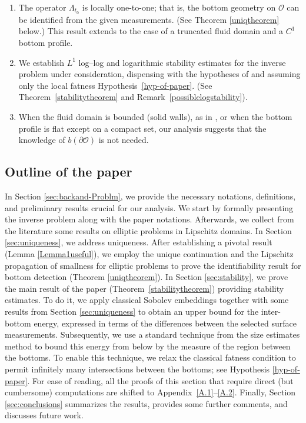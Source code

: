 \documentclass[11pt]{article}
\begin{document}
\begin{enumerate}
	\item  The operator $\Lambda_{t_0}$ is locally one-to-one; that is, the bottom geometry on $\mathcal O$ can be identified from the given measurements.  (See Theorem \ref{uniqtheorem} below.) This result extends \cite{fontelos2017bottom} to the case of a truncated fluid domain and a $C^1$ bottom profile. 
	
	\item We establish $L^{1}$ log--log and logarithmic stability estimates for the inverse problem under consideration,  dispensing with the hypotheses of \cite{lecaros2020stability} and assuming only the local fatness Hypothesis~\ref{hyp-of-paper}.  (See Theorem~\ref{stabilitytheorem} and Remark~\ref{possiblelogstability}).



	\item When the fluid domain is bounded (solid walls), as in \cite{lecaros2020stability}, or when the bottom profile is flat except on a compact set, our analysis suggests that the knowledge of $b(\partial \mathcal O)$ is not needed.
\end{enumerate}


\subsection{Outline of the paper}
In Section \ref{sec:backand-Problm}, we provide the necessary notations, definitions, and preliminary results crucial for our analysis. We start by formally presenting the inverse problem along with the paper notations. Afterwards, we collect from the literature some results on elliptic problems in Lipschitz domains. In Section \ref{sec:uniqueness},  we address uniqueness. After establishing a pivotal result (Lemma \ref{Lemma1useful}), we employ the unique continuation and the Lipschitz propagation of smallness for elliptic problems to prove the identifiability result for bottom detection (Theorem \ref{uniqtheorem}).
In Section \ref{sec:stability},  we prove the main result of the paper (Theorem~\ref{stabilitytheorem}) providing stability estimates. To do it, we 
apply classical Sobolev embeddings together with some results from Section \ref{sec:uniqueness} to obtain an upper bound for the inter-bottom energy, expressed in terms of the differences between the selected surface measurements. Subsequently, we use a standard technique from the size estimates method to bound this energy from below by the measure of the region between the bottoms.
To enable this technique, we relax the classical fatness condition to permit infinitely many intersections between the bottoms; see Hypothesis \ref{hyp-of-paper}. For ease of reading, all the proofs of this section that require direct (but cumbersome) computations are shifted to Appendix~\ref{A.1}--\ref{A.2}. Finally,
Section \ref{sec:conclusions} summarizes the results, provides some further comments, and discusses future work.
\end{document}
